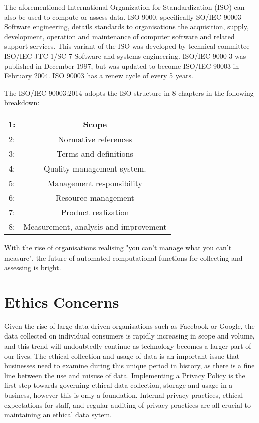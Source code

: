 \documentclass{article}
\begin{document}
The aforementioned International Organization for Standardization (ISO) can also be used to compute or assess data. ISO 9000, specifically SO/IEC 90003 Software engineering, details standards to organisations the acquisition, supply, development, operation and maintenance of computer software and related support services. This variant of the ISO was developed by technical committee ISO/IEC JTC 1/SC 7 Software and systems engineering. ISO/IEC 9000-3 was published in December 1997, but was updated to become ISO/IEC 90003 in February 2004. ISO 90003 has a renew cycle of every 5 years. \cite{iso}

The ISO/IEC 90003:2014 adopts the ISO structure in 8 chapters in the following breakdown:

\begin{center}
\begin{tabular}{||c c||} 
\hline
1: & Scope \\ 
\hline
2: & Normative references \\ 
\hline
3: & Terms and definitions \\
\hline
4: & Quality management system. \\
\hline
5: & Management responsibility \\
\hline
6: & Resource management \\ 
\hline
7: & Product realization \\
\hline
8: & Measurement, analysis and improvement \\
\hline
\end{tabular}
\end{center}

With the rise of organisations realising "you can't manage what you can't measure", the future of automated computational functions for collecting and assessing is bright. 

\section {Ethics Concerns} Given the rise of large data driven organisations such as Facebook or Google, the data collected on individual consumers is rapidly increasing in scope and volume, and this trend will undoubtedly continue as technology becomes a larger part of our lives. The ethical collection and usage of data is an important issue that businesses need to examine during this unique period in history, as there is a fine line between the use and misuse of data. Implementing a Privacy Policy is the first step towards governing ethical data collection, storage and usage in a business, however this is only a foundation. Internal privacy practices, ethical expectations for staff, and regular auditing of privacy practices are all crucial to maintaining an ethical data sytem. \newline
\end{document}
